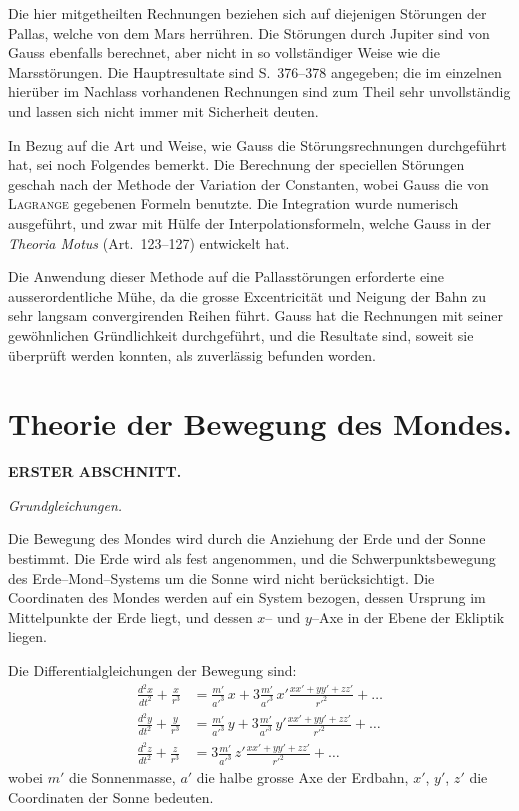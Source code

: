 \documentclass[10pt,a4paper]{article}
\begin{document}
Die hier mitgetheilten Rechnungen beziehen sich auf diejenigen St\"orungen der Pallas, welche von dem Mars herr\"uhren. Die St\"orungen durch Jupiter sind von Gauss ebenfalls berechnet, aber nicht in so vollst\"andiger Weise wie die Marsst\"orungen. Die Hauptresultate sind S.~376--378 angegeben; die im einzelnen hier\"uber im Nachlass vorhandenen Rechnungen sind zum Theil sehr unvollst\"andig und lassen sich nicht immer mit Sicherheit deuten.

\newpage
\noindent
In Bezug auf die Art und Weise, wie Gauss die St\"orungsrechnungen durchgef\"uhrt hat, sei noch Folgendes bemerkt. Die Berechnung der speciellen St\"orungen geschah nach der Methode der Variation der Constanten, wobei Gauss die von\textsc{ Lagrange} gegebenen Formeln benutzte. Die Integration wurde numerisch ausgef\"uhrt, und zwar mit H\"ulfe der Interpolationsformeln, welche Gauss in der \textit{Theoria Motus} (Art.~123--127) entwickelt hat.

Die Anwendung dieser Methode auf die Pallasst\"orungen erforderte eine ausserordentliche M\"uhe, da die grosse Excentricit\"at und Neigung der Bahn zu sehr langsam convergirenden Reihen f\"uhrt. Gauss hat die Rechnungen mit seiner gew\"ohnlichen Gr\"undlichkeit durchgef\"uhrt, und die Resultate sind, soweit sie \"uberpr\"uft werden konnten, als zuverl\"assig befunden worden.


\newpage
\section*{Theorie der Bewegung des Mondes.}

\bigskip
\noindent\textbf{ERSTER ABSCHNITT.}

\medskip
\noindent\textit{Grundgleichungen.}

\medskip
\noindent
[1.] Die Bewegung des Mondes wird durch die Anziehung der Erde und der Sonne bestimmt. Die Erde wird als fest angenommen, und die Schwerpunktsbewegung des Erde--Mond--Systems um die Sonne wird nicht ber\"ucksichtigt. Die Coordinaten des Mondes werden auf ein System bezogen, dessen Ursprung im Mittelpunkte der Erde liegt, und dessen $x$-- und $y$--Axe in der Ebene der Ekliptik liegen.

Die Differentialgleichungen der Bewegung sind:
\begin{align*}
\frac{d^2x}{dt^2} + \frac{x}{r^3} &= \frac{m'}{a'^3}\,x + 3\frac{m'}{a'^3}\,x'\frac{xx'+yy'+zz'}{r'^2} + \dots \\
\frac{d^2y}{dt^2} + \frac{y}{r^3} &= \frac{m'}{a'^3}\,y + 3\frac{m'}{a'^3}\,y'\frac{xx'+yy'+zz'}{r'^2} + \dots \\
\frac{d^2z}{dt^2} + \frac{z}{r^3} &= 3\frac{m'}{a'^3}\,z'\frac{xx'+yy'+zz'}{r'^2} + \dots
\end{align*}
wobei $m'$ die Sonnenmasse, $a'$ die halbe grosse Axe der Erdbahn, $x'$, $y'$, $z'$ die Coordinaten der Sonne bedeuten.
\end{document}
